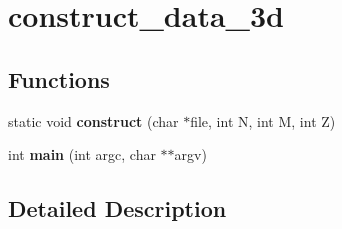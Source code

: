 \hypertarget{group__applications__mri3d__construct__data__3d}{\section{construct\-\_\-data\-\_\-3d}
\label{group__applications__mri3d__construct__data__3d}
}
\subsection*{Functions}
\begin{DoxyCompactItemize}
\item 
\hypertarget{group__applications__mri3d__construct__data__3d_gaf6e5c02bb968f96600d6f91018b38ee1}{static void {\bfseries construct} (char $\ast$file, int N, int M, int Z)}\label{group__applications__mri3d__construct__data__3d_gaf6e5c02bb968f96600d6f91018b38ee1}

\item 
\hypertarget{group__applications__mri3d__construct__data__3d_ga3c04138a5bfe5d72780bb7e82a18e627}{int {\bfseries main} (int argc, char $\ast$$\ast$argv)}\label{group__applications__mri3d__construct__data__3d_ga3c04138a5bfe5d72780bb7e82a18e627}

\end{DoxyCompactItemize}


\subsection{Detailed Description}
